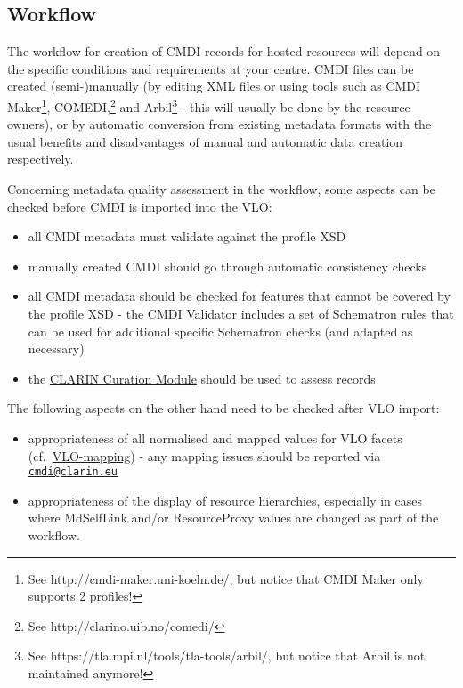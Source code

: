 \subsection{Workflow}\label{authoring-workflow}

The workflow for creation of CMDI records for hosted resources will depend on the specific conditions and requirements at your centre. CMDI files can be created (semi-)manually (by editing XML files or using tools such as CMDI Maker\footnote{See http://cmdi-maker.uni-koeln.de/, but notice that CMDI Maker only supports 2 profiles!}, COMEDI,\footnote{See http://clarino.uib.no/comedi/} and Arbil\footnote{See
https://tla.mpi.nl/tools/tla-tools/arbil/, but notice that Arbil is not maintained anymore!} - this will usually be done by the resource owners), or by automatic conversion from existing metadata formats with the usual benefits and disadvantages of manual and automatic data creation respectively.

Concerning metadata quality assessment in the workflow, some aspects can be checked before CMDI is imported into the VLO:

\begin{itemize}
\tightlist
\item
  all CMDI metadata must validate against the profile XSD
\item
  manually created CMDI should go through automatic consistency checks
\item
  all CMDI metadata should be checked for features that cannot be   covered by the profile XSD - the
  \href{https://github.com/clarin-eric/cmdi-instance-validator/releases/latest}{CMDI Validator} includes a set of Schematron rules that can be used for   additional specific Schematron checks (and adapted as necessary)
\item
  the \href{https://clarin.oeaw.ac.at/curate/}{CLARIN Curation Module}   should be used to assess records
\end{itemize}

The following aspects on the other hand need to be checked after VLO import:

\begin{itemize}
\tightlist
\item
  appropriateness of all normalised and mapped values for VLO facets (cf.~\href{https://github.com/clarin-eric/VLO-mapping}{VLO-mapping}) - any mapping issues should be reported via \href{mailto:cmdi@clarin.eu}{\nolinkurl{cmdi@clarin.eu}}
\item
  appropriateness of the display of resource hierarchies, especially in cases where MdSelfLink and/or ResourceProxy values are changed as part of the workflow.
\end{itemize}
